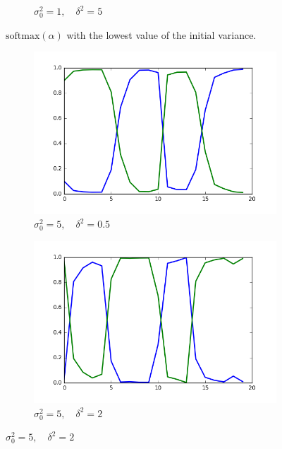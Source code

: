 \documentclass[12pt]{article}
\begin{document}
\begin{figure}[H]
\begin{subfigure}[b]{0.33\textwidth}
                \caption{$\sigma^2_0=1,\quad \delta^2=5$}
                \label{fig:tiger}
        \end{subfigure}
        \caption{$\mbox{softmax}(\alpha)$ with the lowest value of the initial variance.}\label{fig:animals}
\end{figure}
\begin{figure}[H]
        \begin{subfigure}[b]{0.33\textwidth}
                \includegraphics[width=\linewidth]{init-5_prop-05}
                \caption{$\sigma^2_0=5,\quad \delta^2=0.5$}
                \label{fig:gull}
        \end{subfigure}%
        \begin{subfigure}[b]{0.33\textwidth}
                \includegraphics[width=\linewidth]{init-5_prop-2}
                \caption{$\sigma^2_0=5,\quad \delta^2=2$}
                \label{fig:gull2}

\end{subfigure}
\end{figure}
\end{document}
